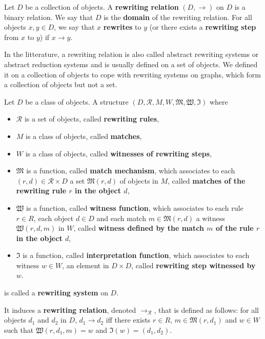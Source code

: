 \begin{definition}
  \label{def:ars}
  Let $D$ be a collection of objects.
  A \textbf{rewriting relation} $(D, \rightarrow)$ on $D$ is a binary relation.
   We say that $D$ is the \textbf{domain} of the rewriting relation. For all objects $x,y\in D$, we say that $x$ \textbf{rewrites} to $y$ (or there exists a \textbf{rewriting step} from $x$ to $y$) if $x \rightarrow y$.
\end{definition}
 
In the litterature, a rewriting relation is also called abstract rewriting systems or abstract reduction systems \cite{nipkow1998term,terese2003term} and is usually defined on a set of objects. We defined it on a collection of objects to cope with rewriting systems on graphs, which form a collection of objects but not a set.
 
\begin{definition}
  \label{def:rewriting_system_no_framework}
  Let $D$ be a class of objects. 
  A structure $(D, \mathcal{R},M,W,\mathfrak{M},\mathfrak{W},\mathfrak{I})$ where 
  \begin{itemize}
    \item $\mathcal{R}$ is a set of objects, called \textbf{rewriting rules}, 
    \item $M$ is a class of objects, called \textbf{matches}, 
    \item $W$ is a class of objects, called \textbf{witnesses of rewriting steps},  
    \item $\mathfrak{M}$ is a function, called \textbf{match mechanism}, which associates to each $(r,d) \in \mathcal{R} \times D$ a set $\mathfrak{M}(r,d)$ of objects in $M$, called \textbf{matches of the rewriting rule $r$ in the object $d$},
    \item $\mathfrak{W}$ is a function, called \textbf{witness function}, which associates to each rule $r \in R$, 
        each object $d \in D$ and each match $m \in \mathfrak{M}(r,d)$ 
        a witness $\mathfrak{W}(r,d,m)$ in $W$, 
        called \textbf{witness defined by the match $m$ of the rule $r$ in the object $d$},
    \item $\mathfrak{I}$ is a function, called \textbf{interpretation function},  
        which associates to each witness $w \in W$, an element 
        in $D \times D$, called \textbf{rewriting step witnessed by $w$}.
  \end{itemize}
   is called a \textbf{rewriting system} on $D$.
   
   It induces a \textbf{rewriting relation}, denoted $\rightarrow_\mathcal{R}$, that is defined as follows: for all objects $d_1$ and $d_2$ in $D$, $d_1 \rightarrow d_2$ iff there exists $r \in R$, $m \in \mathfrak{M}(r,d_1)$ and $w \in W$ such that $\mathfrak{W}(r,d_1,m) = w$ and $\mathfrak{I}(w) = (d_1,d_2)$.
\end{definition}

